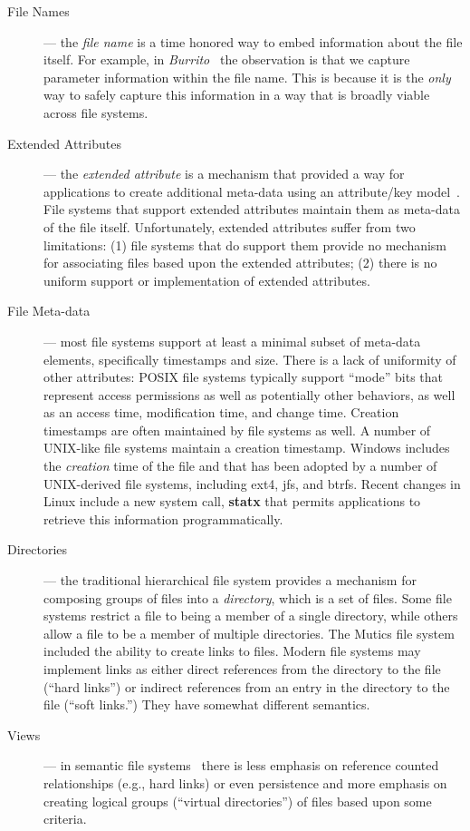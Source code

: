 \documentclass[sigconf,anonymous,review]{acmart}
\begin{document}
\begin{description}
    \item[File Names] --- the \emph{file name} is a time honored way to embed
    information about the file itself.  For example, in
    \emph{Burrito}~\cite{guo2012burrito} the observation is that we capture
    parameter information within the file name.  This is because it is the
    \emph{only} way to safely capture this information in a way that is broadly
    viable across file systems.

    \item[Extended Attributes] --- the \emph{extended attribute} is a mechanism
    that provided a way for applications to create additional meta-data using an
    attribute/key model~\cite{mogul1986representing}.  File systems that support extended attributes maintain
    them as meta-data of the file itself.  Unfortunately, extended attributes
    suffer from two limitations: (1) file systems that do support them provide
    no mechanism for associating files based upon the extended attributes; (2)
    there is no uniform support or implementation of extended attributes.

    \item[File Meta-data] --- most file systems support at least a minimal
    subset of meta-data elements, specifically timestamps and size. There is a
    lack of uniformity of other attributes: POSIX file systems typically support
    ``mode'' bits that represent access permissions as well as potentially other
    behaviors, as well as an access time, modification time, and change time.
    Creation timestamps are often maintained by file systems as well.  A number
    of UNIX-like file systems maintain a creation timestamp.  Windows includes
    the \emph{creation} time of the file and that has been adopted by a number
    of UNIX-derived file systems, including ext4, jfs, and btrfs.  Recent
    changes in Linux include a new system call, \textbf{statx} that permits
    applications to retrieve this information programmatically.

    \item[Directories] --- the traditional hierarchical file system provides a
    mechanism for composing groups of files into a \emph{directory}, which is a
    set of files.  Some file systems restrict a file to being a member of a
    single directory, while others allow a file to be a member of multiple
    directories. The Mutics file system included the ability to create links to
    files.  Modern file systems may implement links as either direct references
    from the directory to the file (``hard links'') or indirect references from
    an entry in the directory to the file (``soft links.'')  They have somewhat
    different semantics.

    \item[Views] --- in semantic file systems~\cite{gifford1991semantic} there
    is less emphasis on reference counted relationships (e.g., hard links) or
    even persistence and more emphasis on creating logical groups (``virtual
    directories'') of files based upon some criteria.

\end{description}
\end{document}
